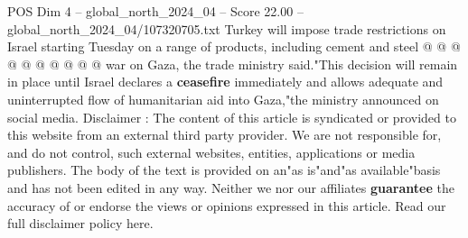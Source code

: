 \begin{textsample}{POS Dim 4 – global\_north\_2024\_04 – Score 22.00 – global\_north\_2024\_04/107320705.txt}
Turkey will impose trade restrictions on Israel starting Tuesday on a range of products, including cement and steel @ @ @ @ @ @ @ @ @ @ war on Gaza, the trade ministry said."This decision will remain in place until Israel declares a \textbf{ceasefire} immediately and allows adequate and uninterrupted flow of humanitarian aid into Gaza,"the ministry announced on social media.
Disclaimer : The content of this article is syndicated or provided to this website from an external third party provider.
We are not responsible for, and do not control, such external websites, entities, applications or media publishers.
The body of the text is provided on an"as is"and"as available"basis and has not been edited in any way.
Neither we nor our affiliates \textbf{guarantee} the accuracy of or endorse the views or opinions expressed in this article.
Read our full disclaimer policy here.

\end{textsample}

